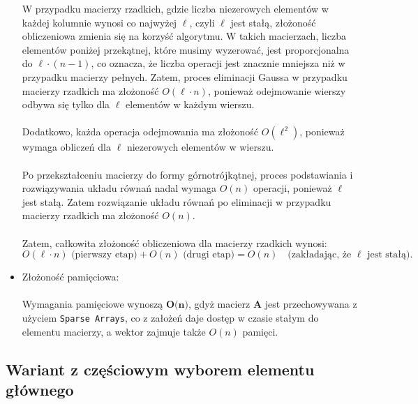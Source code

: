 \documentclass{article}
\begin{document}
\begin{itemize}
W przypadku macierzy rzadkich, gdzie liczba niezerowych elementów w każdej kolumnie wynosi co najwyżej \( \ell \), czyli \( \ell \) jest stałą, złożoność obliczeniowa zmienia się na korzyść algorytmu. W takich macierzach, liczba elementów poniżej przekątnej, które musimy wyzerować, jest proporcjonalna do \( \ell \cdot (n - 1) \), co oznacza, że liczba operacji jest znacznie mniejsza niż w przypadku macierzy pełnych. Zatem, proces eliminacji Gaussa w przypadku macierzy rzadkich ma złożoność \( O(\ell \cdot n) \), ponieważ odejmowanie wierszy odbywa się tylko dla \( \ell \) elementów w każdym wierszu.
\\ \\
Dodatkowo, każda operacja odejmowania ma złożoność \( O(\ell^2) \), ponieważ wymaga obliczeń dla \( \ell \) niezerowych elementów w wierszu.
\\ \\
Po przekształceniu macierzy do formy górnotrójkątnej, proces podstawiania i rozwiązywania układu równań nadal wymaga \( O(n) \) operacji, ponieważ \( \ell \) jest stałą. Zatem rozwiązanie układu równań po eliminacji w przypadku macierzy rzadkich ma złożoność \( O(n) \).
\\ \\
Zatem, całkowita złożoność obliczeniowa dla macierzy rzadkich wynosi:
\[
O(\ell \cdot n) \text{ (pierwszy etap)} + O(n) \text{ (drugi etap)} = O(n) \quad \text{(zakładając, że } \ell \text{ jest stałą)}.
\]
    \item Złożoność pamięciowa: \\ \\
    Wymagania pamięciowe wynoszą $\textbf{O(n)}$, gdyż macierz $\mathbf{A}$ jest przechowywana z użyciem \texttt{Sparse Arrays}, co z założeń daje dostęp w czasie stałym do elementu macierzy, a wektor  zajmuje także $O(n)$ pamięci.
\end{itemize}


\subsection{Wariant z częściowym wyborem elementu głównego}
\end{document}
